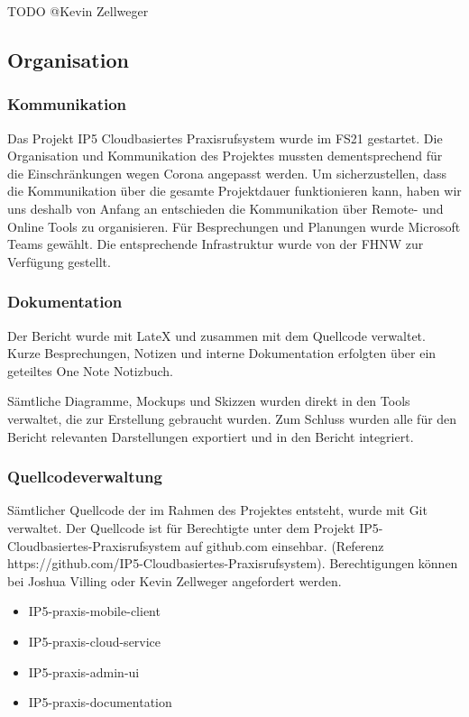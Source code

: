 TODO @Kevin Zellweger

\clearpage

\subsection{Organisation}

    \subsubsection*{Kommunikation}

        Das Projekt IP5 Cloudbasiertes Praxisrufsystem wurde im FS21 gestartet. Die Organisation und Kommunikation des Projektes mussten dementsprechend für die Einschränkungen wegen Corona angepasst werden. 
        Um sicherzustellen, dass die Kommunikation über die gesamte Projektdauer funktionieren kann, haben wir uns deshalb von Anfang an entschieden die Kommunikation über Remote- und Online Tools zu organisieren. 
        Für Besprechungen und Planungen wurde Microsoft Teams gewählt. Die entsprechende Infrastruktur wurde von der FHNW zur Verfügung gestellt. 

    \subsubsection*{Dokumentation}

        Der Bericht wurde mit LateX und zusammen mit dem Quellcode verwaltet. Kurze Besprechungen, Notizen und interne Dokumentation erfolgten über ein geteiltes One Note Notizbuch. 

        Sämtliche Diagramme, Mockups und Skizzen wurden direkt in den Tools verwaltet, die zur Erstellung gebraucht wurden. Zum Schluss wurden alle für den Bericht relevanten Darstellungen exportiert und in den Bericht integriert.

    \subsubsection*{Quellcodeverwaltung}

        Sämtlicher Quellcode der im Rahmen des Projektes entsteht, wurde mit Git verwaltet. Der Quellcode ist für Berechtigte unter dem Projekt IP5-Cloudbasiertes-Praxisrufsystem auf github.com einsehbar. 
        (Referenz https://github.com/IP5-Cloudbasiertes-Praxisrufsystem). Berechtigungen können bei Joshua Villing oder Kevin Zellweger angefordert werden. 

        \begin{itemize}
            \item IP5-praxis-mobile-client
            \item IP5-praxis-cloud-service
            \item IP5-praxis-admin-ui
            \item IP5-praxis-documentation
        \end{itemize}


